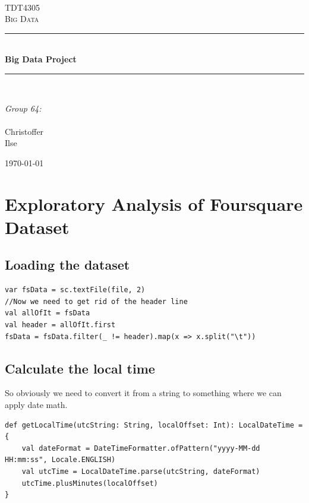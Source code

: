\documentclass[abstract=on]{article}
\title{\mytitle}
\author{\myauthor}
\date{\today}
\newcommand{\mytitle}{Big Data Project}
\newcommand{\mygroupnumber}{64}
\newcommand{\myauthor}{Christoffer\\Ilse}
\begin{document}
\begin{titlepage}
\begin{center}

 
~\\[1.5cm]

\textsc{\Large TDT4305\\Big Data}\\[0.5cm]

\hrule ~\\[0.2cm]
{\huge \bfseries \mytitle}\\[0.4cm]   %
\hrule ~\\[1.5cm]

\begin{minipage}{0.4\textwidth}
    \centering
  \large
    \emph{Group \mygroupnumber:}\\~\\
    \myauthor
\end{minipage}

\vfill

{\large \today}
\end{center}
\end{titlepage}




\section{Exploratory Analysis of Foursquare Dataset}

\subsection{Loading the dataset}
\begin{lstlisting}
var fsData = sc.textFile(file, 2)
//Now we need to get rid of the header line
val allOfIt = fsData
val header = allOfIt.first
fsData = fsData.filter(_ != header).map(x => x.split("\t"))
\end{lstlisting}

\subsection{Calculate the local time}
So obviously we need to convert it from a string to something where we can apply date math.
\begin{lstlisting}
def getLocalTime(utcString: String, localOffset: Int): LocalDateTime = {
    val dateFormat = DateTimeFormatter.ofPattern("yyyy-MM-dd HH:mm:ss", Locale.ENGLISH)
    val utcTime = LocalDateTime.parse(utcString, dateFormat)
    utcTime.plusMinutes(localOffset)
}
\end{lstlisting}
\end{document}
